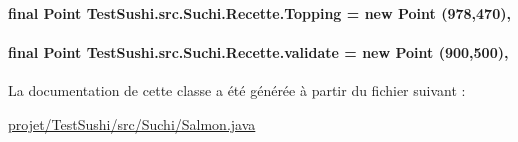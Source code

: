 \paragraph[{Topping}]{\setlength{\rightskip}{0pt plus 5cm}final Point Test\+Sushi.\+src.\+Suchi.\+Recette.\+Topping = new Point (978,470)\hspace{0.3cm}{\ttfamily [protected]}, {\ttfamily [inherited]}}\label{classTestSushi_1_1src_1_1Suchi_1_1Recette_ab7575f64998864f6b053859c18380f58}
\hypertarget{classTestSushi_1_1src_1_1Suchi_1_1Recette_a9c491e7f09a444817e433e54923e6bca}{}
\paragraph[{validate}]{\setlength{\rightskip}{0pt plus 5cm}final Point Test\+Sushi.\+src.\+Suchi.\+Recette.\+validate = new Point (900,500)\hspace{0.3cm}{\ttfamily [protected]}, {\ttfamily [inherited]}}\label{classTestSushi_1_1src_1_1Suchi_1_1Recette_a9c491e7f09a444817e433e54923e6bca}


La documentation de cette classe a été générée à partir du fichier suivant \+:\begin{DoxyCompactItemize}
\item 
\hyperlink{projet_2TestSushi_2src_2Suchi_2Salmon_8java}{projet/\+Test\+Sushi/src/\+Suchi/\+Salmon.\+java}\end{DoxyCompactItemize}
